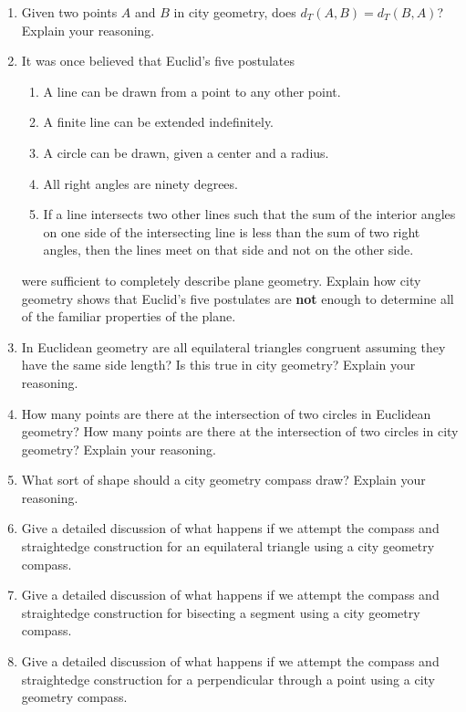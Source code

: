 \begin{problems}
\begin{enumerate}
\item Given two points $A$ and $B$ in city geometry, does $d_T(A,B) =
  d_T(B,A)$? Explain your reasoning.
\item It was once believed that Euclid's five postulates
\begin{enumerate}
\item A line can be drawn from a point to any other point.
\item A finite line can be extended indefinitely.
\item A circle can be drawn, given a center and a radius.
\item All right angles are ninety degrees. 
\item If a line intersects two other lines such that the sum of the
  interior angles on one side of the intersecting line is less than
  the sum of two right angles, then the lines meet on that side and
  not on the other side.
\end{enumerate}
were sufficient to completely describe plane geometry.  Explain how
city geometry shows that Euclid's five postulates are \textbf{not}
enough to determine all of the familiar properties of the plane.

\item In Euclidean geometry are all equilateral triangles congruent
  assuming they have the same side length? Is this true in city
  geometry? Explain your reasoning.

\item How many points are there at the intersection of two circles in
  Euclidean geometry? How many points are there at the intersection of
  two circles in city geometry? Explain your reasoning.

\item What sort of shape should a city geometry compass draw? Explain
  your reasoning.

\item Give a detailed discussion of what happens if we attempt the
  compass and straightedge construction for an equilateral triangle
  using a city geometry compass.

\item Give a detailed discussion of what happens if we attempt the
  compass and straightedge construction for bisecting a segment using
  a city geometry compass.

\item Give a detailed discussion of what happens if we attempt the
  compass and straightedge construction for a perpendicular through a
  point using a city geometry compass.


\end{enumerate}
\end{problems}
